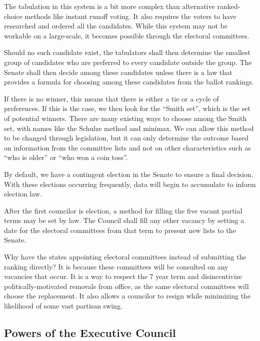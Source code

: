 \documentclass{article}
\newcommand{\quotes}[1]{``#1''}
\begin{document}
The tabulation in this system is a bit more complex than alternative ranked-choice methods like instant runoff voting. It also requires the voters to have researched and ordered all the candidates. While this system may not be workable on a large-scale, it becomes possible through the electoral committees.

\begin{quoting}
Should no such candidate exist, the tabulators shall then determine the smallest group of candidates who are preferred to every candidate outside the group. The Senate shall then decide among these candidates unless there is a law that provides a formula for choosing among these candidates from the ballot rankings.
\end{quoting}

If there is no winner, this means that there is either a tie or a cycle of preferences. If this is the case, we then look for the \quotes{Smith set}\cite{Smith_Set}, which is the set of potential winners. There are many existing ways to choose among the Smith set, with names like the Schulze method\cite{Schulze} and minimax. We can allow this method to be changed through legislation, but it can only determine the outcome based on information from the committee lists and not on other characteristics such as \quotes{who is older} or \quotes{who won a coin toss}.

By default, we have a contingent election in the Senate to ensure a final decision. With these elections occurring frequently, data will begin to accumulate to inform election law.

\begin{quoting}
After the first councilor is election, a method for filling the five vacant partial terms may be set by law. The Council shall fill any other vacancy by setting a date for the electoral committees from that term to present new lists to the Senate.
\end{quoting}

Why have the states appointing electoral committees instead of submitting the ranking directly? It is because these committees will be consulted on any vacancies that occur. It is a way to respect the 7 year term and disincentivize politically-motivated removals from office, as the same electoral committees will choose the replacement. It also allows a councilor to resign while minimizing the likelihood of some vast partisan swing.

\subsection{Powers of the Executive Council}
\end{document}
